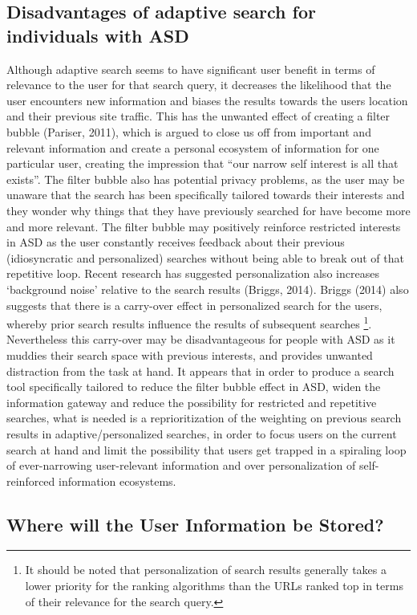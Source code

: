\documentclass[10pt]{article}
\begin{document}
\subsection{Disadvantages of adaptive search for individuals with ASD}
Although adaptive search seems to have significant user benefit in terms of relevance to the user for that search query, it decreases the likelihood that the user encounters new information and biases the results towards the users location and their previous site traffic.  This has the unwanted effect of creating a filter bubble (Pariser, 2011), which is argued to close us off from important and relevant information and create a personal ecosystem of information for one particular user, creating the impression that “our narrow self interest is all that exists”. The filter bubble also has potential privacy problems, as the user may be unaware that the search has been specifically tailored towards their interests and they wonder why things that they have previously searched for have become more and more relevant. The filter bubble may positively reinforce restricted interests in ASD as the user constantly receives feedback about their previous (idiosyncratic and personalized) searches without being able to break out of that repetitive loop. 
Recent research has suggested personalization also increases ‘background noise’ relative to the search results (Briggs, 2014). Briggs (2014) also suggests that there is a carry-over effect in personalized search for the users, whereby prior search results influence the results of subsequent searches \footnote{It should be noted that personalization of search results generally takes a lower priority for the ranking algorithms than the URLs ranked top in terms of their relevance for the search query.}.  Nevertheless this carry-over may be disadvantageous for people with ASD as it muddies their search space with previous interests, and provides unwanted distraction from the task at hand. 
It appears that in order to produce a search tool specifically tailored to reduce the filter bubble effect in ASD, widen the information gateway and reduce the possibility for restricted and repetitive searches, what is needed is a reprioritization of the weighting on previous search results in adaptive/personalized searches, in order to focus users on the current search at hand and limit the possibility that users get trapped in a spiraling loop of ever-narrowing user-relevant information and over personalization of self-reinforced information ecosystems.

\subsection{Where will the User Information be Stored?}
\end{document}
